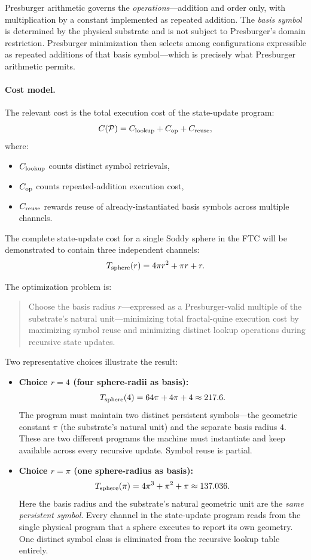 \documentclass[11pt,a4paper]{article}
\begin{document}
Presburger arithmetic governs the \emph{operations}---addition and order only, with multiplication by a constant implemented as repeated addition. The \emph{basis symbol} is determined by the physical substrate and is not subject to Presburger's domain restriction. Presburger minimization then selects among configurations expressible as repeated additions of that basis symbol---which is precisely what Presburger arithmetic permits.

\paragraph{Cost model.}

The relevant cost is the total execution cost of the state-update program:
\[
C(\mathcal{P}) = C_{\rm lookup} + C_{\rm op} + C_{\rm reuse},
\]
where:
\begin{itemize}
  \item $C_{\rm lookup}$ counts distinct symbol retrievals,
  \item $C_{\rm op}$ counts repeated-addition execution cost,
  \item $C_{\rm reuse}$ rewards reuse of already-instantiated basis symbols
    across multiple channels.
\end{itemize}

The complete state-update cost for a single Soddy sphere in the FTC will be demonstrated to contain three independent channels:
\[
T_{\rm sphere}(r) = 4\pi r^2 + \pi r + r.
\]

The optimization problem is:

\begin{quote}
Choose the basis radius $r$---expressed as a Presburger-valid multiple of the substrate's natural unit---minimizing total fractal-quine execution cost by maximizing symbol reuse and minimizing distinct lookup operations during recursive state updates.
\end{quote}

Two representative choices illustrate the result:

\begin{itemize}
  \item \textbf{Choice $r = 4$ (four sphere-radii as basis):}
  \[
  T_{\rm sphere}(4) = 64\pi + 4\pi + 4 \approx 217.6.
  \]
  The program must maintain two distinct persistent symbols---the geometric constant $\pi$ (the substrate's natural unit) and the separate basis radius $4$. These are two different programs the machine must instantiate and keep available across every recursive update. Symbol reuse is partial.

  \item \textbf{Choice $r = \pi$ (one sphere-radius as basis):}
  \[
  T_{\rm sphere}(\pi) = 4\pi^3 + \pi^2 + \pi \approx 137.036.
  \]
  Here the basis radius and the substrate's natural geometric unit are the
  \emph{same persistent symbol}. Every channel in the state-update program
  reads from the single physical program that a sphere executes to report its
  own geometry. One distinct symbol class is eliminated from the recursive
  lookup table entirely.
\end{itemize}
\end{document}
